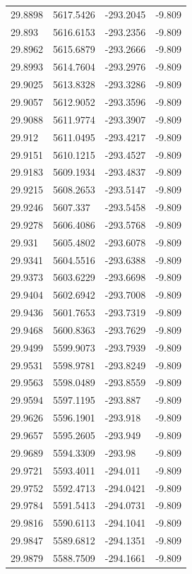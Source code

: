 \begin{table}[H]
\begin{tabular}{llll}
29.8898 & 5617.5426 & -293.2045 & -9.809 \\
29.893 & 5616.6153 & -293.2356 & -9.809 \\
29.8962 & 5615.6879 & -293.2666 & -9.809 \\
29.8993 & 5614.7604 & -293.2976 & -9.809 \\
29.9025 & 5613.8328 & -293.3286 & -9.809 \\
29.9057 & 5612.9052 & -293.3596 & -9.809 \\
29.9088 & 5611.9774 & -293.3907 & -9.809 \\
29.912 & 5611.0495 & -293.4217 & -9.809 \\
29.9151 & 5610.1215 & -293.4527 & -9.809 \\
29.9183 & 5609.1934 & -293.4837 & -9.809 \\
29.9215 & 5608.2653 & -293.5147 & -9.809 \\
29.9246 & 5607.337 & -293.5458 & -9.809 \\
29.9278 & 5606.4086 & -293.5768 & -9.809 \\
29.931 & 5605.4802 & -293.6078 & -9.809 \\
29.9341 & 5604.5516 & -293.6388 & -9.809 \\
29.9373 & 5603.6229 & -293.6698 & -9.809 \\
29.9404 & 5602.6942 & -293.7008 & -9.809 \\
29.9436 & 5601.7653 & -293.7319 & -9.809 \\
29.9468 & 5600.8363 & -293.7629 & -9.809 \\
29.9499 & 5599.9073 & -293.7939 & -9.809 \\
29.9531 & 5598.9781 & -293.8249 & -9.809 \\
29.9563 & 5598.0489 & -293.8559 & -9.809 \\
29.9594 & 5597.1195 & -293.887 & -9.809 \\
29.9626 & 5596.1901 & -293.918 & -9.809 \\
29.9657 & 5595.2605 & -293.949 & -9.809 \\
29.9689 & 5594.3309 & -293.98 & -9.809 \\
29.9721 & 5593.4011 & -294.011 & -9.809 \\
29.9752 & 5592.4713 & -294.0421 & -9.809 \\
29.9784 & 5591.5413 & -294.0731 & -9.809 \\
29.9816 & 5590.6113 & -294.1041 & -9.809 \\
29.9847 & 5589.6812 & -294.1351 & -9.809 \\
29.9879 & 5588.7509 & -294.1661 & -9.809 \\

\end{tabular}
\end{table}
